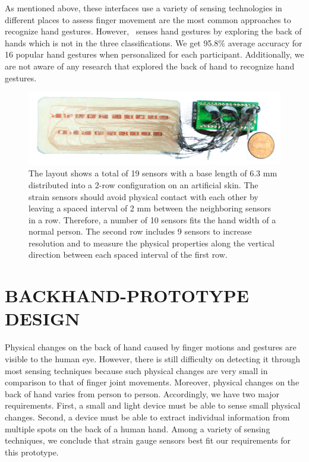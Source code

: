 \documentclass{sigchi}
\begin{document}
As mentioned above, these interfaces use a variety of sensing technologies in different places to assess finger movement are the most common approaches to recognize hand gestures. However, \getTitleName\ senses hand gestures by exploring the back of hands which is not in the three classifications. We get 95.8\% average accuracy for 16 popular hand gestures when personalized for each participant. Additionally, we are not aware of any research that explored the back of hand to recognize hand gestures.

\begin{figure}[b]
 \begin{center}
  \includegraphics[width=1\columnwidth]{figures/prototypeV2.jpg}
  \caption{The layout shows a total of 19 sensors with a base length of 6.3 mm distributed into a 2-row configuration on an artificial skin. The strain sensors should avoid physical contact with each other by leaving a spaced interval of 2 mm between the neighboring sensors in a row. Therefore, a number of 10 sensors fits the hand width of a normal person. The second row includes 9 sensors to increase resolution and to measure the physical properties along the vertical direction between each spaced interval of the first row.}
  \label{fig:tie}
  \end{center}
\end{figure}

\section{BACKHAND-PROTOTYPE DESIGN}

Physical changes on the back of hand caused by finger motions and gestures are visible to the human eye. However, there is still difficulty on detecting it through most sensing techniques because such physical changes are very small in comparison to that of finger joint movements. Moreover, physical changes on the back of hand varies from person to person. Accordingly, we have two major requirements. First, a small and light device must be able to sense small physical changes. Second, a device must be able to extract individual information from multiple spots on the back of a human hand. Among a variety of sensing techniques, we conclude that strain gauge sensors best fit our requirements for this prototype.
 
\end{document}
